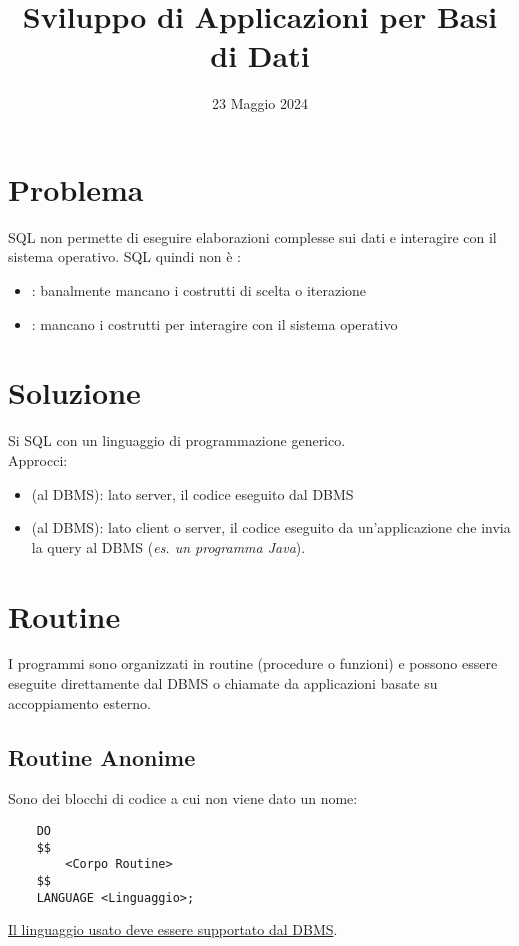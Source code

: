 \documentclass[12pt]{article}
\title{Sviluppo di Applicazioni per Basi di Dati}
\date{23 Maggio 2024}
\begin{document}
\maketitle
\section{Problema}
SQL non permette di eseguire elaborazioni complesse sui dati e interagire con il sistema operativo. SQL quindi non è :
\begin{itemize}
    \item {}: banalmente mancano i costrutti di scelta o iterazione
    \item {}: mancano i costrutti per interagire con il sistema operativo
\end{itemize}
\section{Soluzione}
Si  SQL con un linguaggio di programmazione generico.\\
Approcci:
\begin{itemize}
    \item {}(al DBMS): lato server, il codice eseguito dal DBMS
    \item {}(al DBMS): lato client o server, il codice eseguito da un'applicazione che invia la query al DBMS (\textit{es. un programma Java}).
\end{itemize}
\section{Routine}
I programmi sono organizzati in routine (procedure o funzioni) e possono essere eseguite direttamente dal DBMS o chiamate da applicazioni basate su accoppiamento esterno.
\subsection{Routine Anonime}
Sono dei blocchi di codice a cui non viene dato un nome:
\begin{lstlisting}
    DO
    $$
        <Corpo Routine>
    $$
    LANGUAGE <Linguaggio>;
\end{lstlisting}
\underline{Il linguaggio usato deve essere supportato dal DBMS}.
\end{document}

